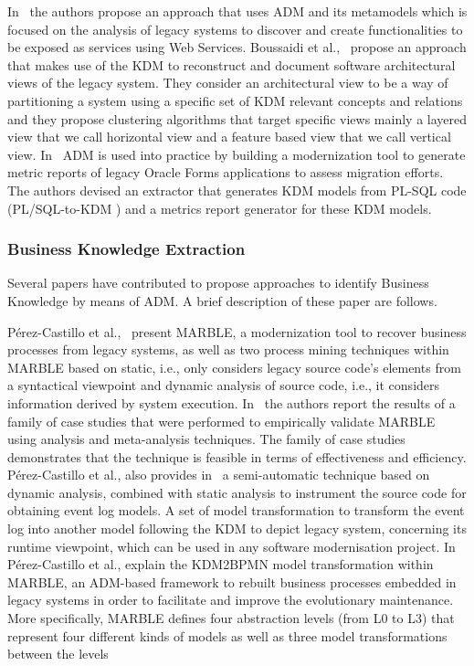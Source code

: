 In~\cite{4400179} the authors propose an approach that uses ADM and its metamodels which is focused on the analysis of legacy systems to discover and create functionalities to be exposed as services using Web Services. Boussaidi et al.,~\cite{6385130} propose an approach that makes use of the KDM to reconstruct and document software architectural views of the legacy system. They consider an architectural view to be a way of partitioning a system using a specific set of KDM relevant concepts and relations and they propose clustering algorithms that target specific views mainly a layered view that we call horizontal view and a feature based view that we call vertical view. In~\cite{5440163} ADM is used into practice by building a modernization tool to generate metric reports of legacy Oracle Forms applications to assess migration efforts. The authors devised an extractor that generates KDM models from PL-SQL code (PL/SQL-to-KDM ) and a metrics report generator for these KDM models. 

\subsubsection{Business Knowledge Extraction}
\label{ssub:Business_Knowledge_Extraction}

Several papers have contributed to propose approaches to identify Business Knowledge by means of ADM. A brief description of these paper are follows.

P\'{e}rez-Castillo et al.,~\cite{Perez-Castillo:2011:ECS:1982185.1982249,6080834, 6498507} present MARBLE, a modernization tool to recover business processes from legacy systems, as well as two process mining techniques within MARBLE based on static, i.e., only considers legacy source code's elements from a syntactical viewpoint  and dynamic analysis of source code, i.e., it considers information derived by system execution. In~\cite{PerezCastillo20121370} the authors report the results of a family of case studies that were performed to empirically validate MARBLE using analysis and meta-analysis techniques. The family of case studies demonstrates that the technique is feasible in terms of effectiveness and efficiency. P\'{e}rez-Castillo et al., also provides in~\cite{5871783} a semi-automatic technique based on dynamic analysis, combined with static analysis to instrument the source code for obtaining event log models. A set of model transformation to transform the event log into another model following the KDM to depict legacy system, concerning its runtime viewpoint, which can be used in any software modernisation project. In~\cite{Perez-Castillo:2010:IBP:1875847.1875861} P\'{e}rez-Castillo et al., explain the KDM2BPMN model transformation within MARBLE, an ADM-based framework to rebuilt business processes embedded in legacy systems in order to facilitate and improve the evolutionary maintenance. More specifically, MARBLE defines four abstraction levels (from L0 to L3) that represent four different kinds of models as well as three model transformations between the levels

